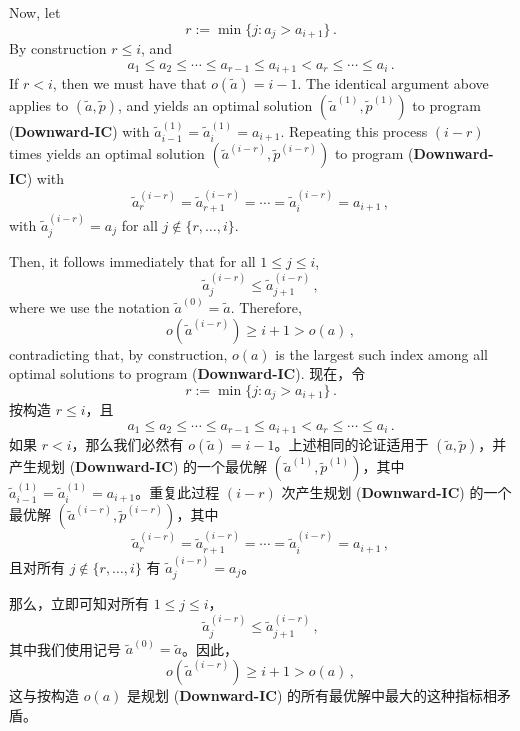 \documentclass[12pt,letterpaper]{article}
\newenvironment{original}{\color{black}\noindent}{}
\newenvironment{translation}{\color{blue}\noindent}{}
\theoremstyle{plain}
\theoremstyle{definition}
\theoremstyle{remark}
\renewcommand{\1}{\mathds{1}}
\theoremstyle{definition}
\begin{document}
\begin{original}
Now, let
\[r := \min \big\{j: a_j > a_{i+1} \big\} \,.\]
By construction $r \leq i$, and
\[a_1 \leq a_2 \leq \cdots \leq a_{r-1} \leq a_{i+1} < a_{r} \leq \cdots \leq a_i\,.\]
If $r < i$, then we must have that $o(\tilde{a}) = i-1$. The identical argument above applies to $(\tilde{a}, \tilde{p})$, and yields an optimal solution $(\tilde{a}^{(1)}, \tilde{p}^{(1)})$ to program (\textbf{Downward-IC}) with $\tilde{a}^{(1)}_{i-1} = \tilde{a}^{(1)}_{i} = a_{i+1}$. Repeating this process $(i - r)$ times yields an optimal solution $(\tilde{a}^{(i-r)}, \tilde{p}^{(i-r)})$ to program (\textbf{Downward-IC}) with
\[\tilde{a}^{(i-r)}_{r} = \tilde{a}^{(i-r)}_{r+1} = \cdots = \tilde{a}^{(i-r)}_{i} = a_{i+1}\,,\]
with $\tilde{a}^{(i-r)}_{j} = a_j$ for all $j \not \in \{r, \dots, i\}$.

Then, it follows immediately that for all $1 \leq j \leq i$,
\[ \tilde{a}^{(i-r)}_j \leq  \tilde{a}^{(i-r)}_{j+1}\,,\]
where we use the notation $\tilde{a}^{(0)} = \tilde{a}$. Therefore,
\[o(\tilde{a}^{(i-r)}) \geq i + 1 > o(a)\,,\]
contradicting that, by construction, $o(a)$ is the largest such index among all optimal solutions to program (\textbf{Downward-IC}).
\end{original}
\begin{translation}
现在，令
\[r := \min \big\{j: a_j > a_{i+1} \big\} \,.\]
按构造 $r \leq i$，且
\[a_1 \leq a_2 \leq \cdots \leq a_{r-1} \leq a_{i+1} < a_{r} \leq \cdots \leq a_i\,.\]
如果 $r < i$，那么我们必然有 $o(\tilde{a}) = i-1$。上述相同的论证适用于 $(\tilde{a}, \tilde{p})$，并产生规划 (\textbf{Downward-IC}) 的一个最优解 $(\tilde{a}^{(1)}, \tilde{p}^{(1)})$，其中 $\tilde{a}^{(1)}_{i-1} = \tilde{a}^{(1)}_{i} = a_{i+1}$。重复此过程 $(i - r)$ 次产生规划 (\textbf{Downward-IC}) 的一个最优解 $(\tilde{a}^{(i-r)}, \tilde{p}^{(i-r)})$，其中
\[\tilde{a}^{(i-r)}_{r} = \tilde{a}^{(i-r)}_{r+1} = \cdots = \tilde{a}^{(i-r)}_{i} = a_{i+1}\,,\]
且对所有 $j \not \in \{r, \dots, i\}$ 有 $\tilde{a}^{(i-r)}_{j} = a_j$。

那么，立即可知对所有 $1 \leq j \leq i$，
\[ \tilde{a}^{(i-r)}_j \leq  \tilde{a}^{(i-r)}_{j+1}\,,\]
其中我们使用记号 $\tilde{a}^{(0)} = \tilde{a}$。因此，
\[o(\tilde{a}^{(i-r)}) \geq i + 1 > o(a)\,,\]
这与按构造 $o(a)$ 是规划 (\textbf{Downward-IC}) 的所有最优解中最大的这种指标相矛盾。
\end{translation}
\end{document}
